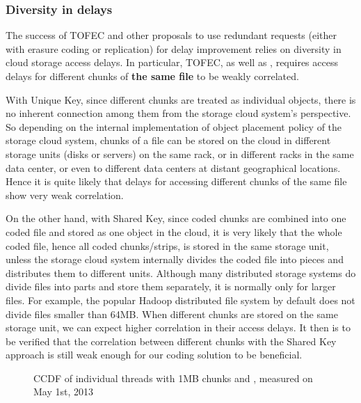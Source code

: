 \documentclass[journal]{IEEEtran}
\newcommand{\ourproposal}{TOFEC\xspace}
\newcommand{\threewidth}{0.3\textwidth}
\begin{document}
\subsubsection{Diversity in delays} The success of \ourproposal and other 
proposals to use redundant requests (either with erasure coding or replication) for delay improvement relies on diversity in cloud storage access delays. In particular, \ourproposal, as well as \cite{fastcloud,Longbocodeingincloud,MDS-queue}, requires access delays for different chunks of {\bf the same file} to be weakly correlated.
  
With Unique Key, since different chunks are treated as individual objects, there is no inherent connection among them from the storage cloud system's perspective. So depending on the internal implementation of object placement policy of the storage cloud system, chunks of a file can be stored on the cloud in different storage units (disks or servers) on the same rack, or in different racks in the same data center, or even to different data centers at distant geographical locations. Hence it is quite likely that delays for accessing different chunks of the same file show very weak correlation. 

On the other hand, with Shared Key, since coded chunks are combined into one coded file and stored as one object in the cloud, it is very likely that the whole coded file, hence all coded chunks/strips, is stored in the same storage unit, unless the storage cloud system internally divides the coded file into pieces and distributes them to different units. Although many distributed storage systems do divide files into parts and store them separately, it is normally only for larger files. For example, the popular Hadoop distributed file system by default does not divide files smaller than 64MB. When different chunks are stored on the same storage unit, we can expect higher correlation in their access delays. It then is to be verified that the correlation between different chunks with the Shared Key approach is still weak enough for our coding solution to be beneficial. 


\begin{figure*}[!t]
\centering
\hfill
\hfill
		\caption{CCDF of individual threads with 1MB chunks and , measured on May 1st, 2013}
\label{fig:ccdf:thread}
\end{figure*}
\end{document}
